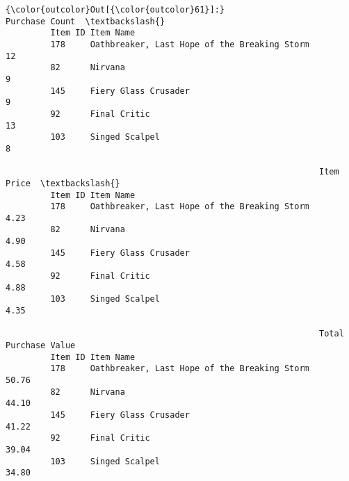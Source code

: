 \documentclass[11pt]{article}
\begin{document}
\begin{Verbatim}[commandchars=\\\{\}]
{\color{outcolor}Out[{\color{outcolor}61}]:}                                                       Purchase Count  \textbackslash{}
         Item ID Item Name                                                      
         178     Oathbreaker, Last Hope of the Breaking Storm              12   
         82      Nirvana                                                    9   
         145     Fiery Glass Crusader                                       9   
         92      Final Critic                                              13   
         103     Singed Scalpel                                             8   
         
                                                               Item Price  \textbackslash{}
         Item ID Item Name                                                  
         178     Oathbreaker, Last Hope of the Breaking Storm        4.23   
         82      Nirvana                                             4.90   
         145     Fiery Glass Crusader                                4.58   
         92      Final Critic                                        4.88   
         103     Singed Scalpel                                      4.35   
         
                                                               Total Purchase Value  
         Item ID Item Name                                                           
         178     Oathbreaker, Last Hope of the Breaking Storm                 50.76  
         82      Nirvana                                                      44.10  
         145     Fiery Glass Crusader                                         41.22  
         92      Final Critic                                                 39.04  
         103     Singed Scalpel                                               34.80  
\end{Verbatim}
            

    
    
    
    
\end{document}
